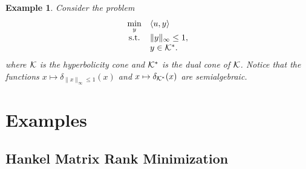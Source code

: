 \documentclass{article}
\numberwithin{equation}{section}
\newtheorem{example}{Example}[theorem]
\begin{document}
    \begin{example}
        Consider the problem
        \begin{equation}\label{KL_hp}
            \begin{array}{cl}
            \min\limits_{y} & \langle u, y\rangle \\
            {\rm s.t.} & \|y\|_\infty \le 1,\\
            & y\in \cal{K}^*.
            \end{array}
            \end{equation}
            where $\cal{K}$ is the hyperbolicity cone and $\cal{K}^*$ is the dual cone of $\cal{K}$. 
            Notice that the functions $x \mapsto \delta_{\|x\|_{\infty}\leq 1}(x)$ and $x\mapsto \delta_{\cal{K}^*}(x)$ 
            are semialgebraic.    
    \end{example}





\section{Examples}
\subsection{Hankel Matrix Rank Minimization}
\end{document}
